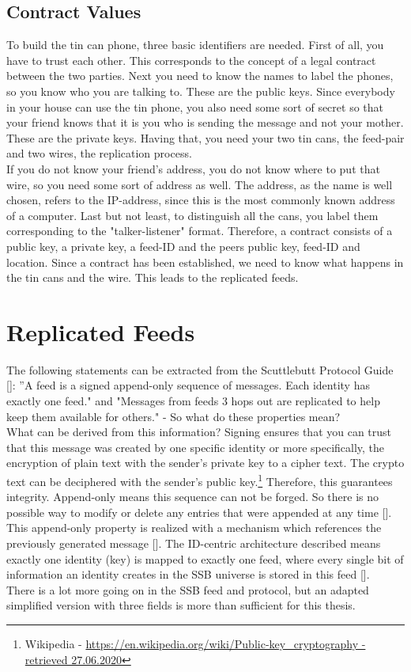 \subsection{Contract Values}
To build the tin can phone, three basic identifiers are needed. First of all, you have to trust each other. This corresponds to the concept of a legal contract between the two parties. Next you need to know the names to label the phones, so you know who you are talking to. These are the public keys. Since everybody in your house can use the tin phone, you also need some sort of secret so that your friend knows that it is you who is sending the message and not your mother. These are the private keys. Having that, you need your two tin cans, the feed-pair and two wires, the replication process.
\\
If you do not know your friend’s address, you do not know where to put that wire, so you need some sort of address as well. The address, as the name is well chosen, refers to the IP-address, since this is the most commonly known address of a computer. Last but not least, to distinguish all the cans, you label them corresponding to the "talker-listener" format. Therefore, a contract consists of a public key, a private key, a feed-ID and the peers public key, feed-ID and location. Since a contract has been established, we need to know what happens in the tin cans and the wire. This leads to the replicated feeds. 



\section{Replicated Feeds}
The following statements can be extracted from the Scuttlebutt Protocol Guide []: ”A feed is a signed append-only sequence of messages. Each identity has exactly one feed." and "Messages from feeds 3 hops out are replicated to help keep them available for others." - So what do these properties mean?\\

What can be derived from this information? Signing ensures that you can trust that this message was created by one specific identity or more specifically, the encryption of plain text with the sender’s private key to a cipher text. The crypto text can be deciphered with the sender’s public key.\footnote{Wikipedia - \url{https://en.wikipedia.org/wiki/Public-key_cryptography - retrieved 27.06.2020}} Therefore, this guarantees integrity. Append-only means this sequence can not be forged. So there is no possible way to modify or delete any entries that were appended at any time []. This append-only property is realized with a mechanism which references the previously generated message []. The ID-centric architecture described means exactly one identity (key) is mapped to exactly one feed, where every single bit of information an identity creates in the SSB universe is stored in this feed [].
\\
There is a lot more going on in the SSB feed and protocol, but an adapted simplified version with three fields is more than sufficient for this thesis. 

